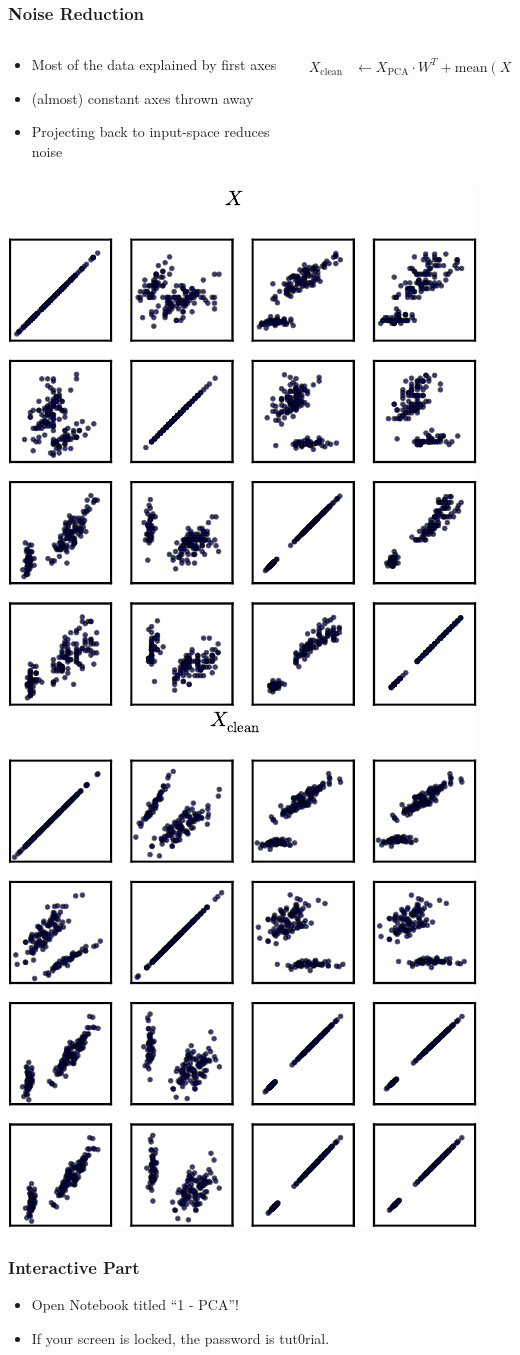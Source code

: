 \begin{frame}[fragile]
  \frametitle{Noise Reduction}
  \begin{columns}
      \begin{column}{.7\linewidth}
          \begin{itemize}
              \item Most of the data explained by first axes
              \item (almost) constant axes thrown away
              \item Projecting back to input-space reduces noise
          \end{itemize}
      \end{column}
      \begin{column}{.3\linewidth}
          \begin{align*}
              \!\!\!\!\!\!X_{\mathrm{clean}} &\leftarrow X_{\mathrm{PCA}}\cdot W^T + \mathrm{mean}(X)
          \end{align*}
      \end{column}
  \end{columns}
  \begin{center}
    \includegraphics[width=.40\linewidth]{pca-pics/iris-all-nocolor}\hfill%
    \includegraphics[width=.40\linewidth]{pca-pics/iris-bt-nocolor}
  \end{center}

\end{frame}

\begin{frame}
  \frametitle{Interactive Part}
  \begin{itemize}
      \item Open Notebook titled ``1 - PCA''!
      \item If your screen is locked, the password is \alert{tut0rial}.
  \end{itemize}
\end{frame}


